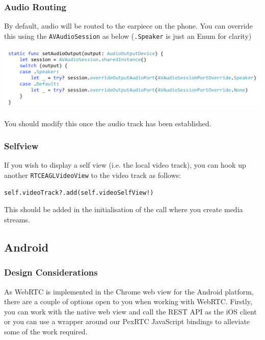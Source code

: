 \documentclass[a4paper,11pt]{article}
\begin{document}
\subsubsection{Audio Routing}
\label{sec:org1eb172f}
By default, audio will be routed to the earpiece on the phone.  You
can override this using the \texttt{AVAudioSession} as below (\texttt{.Speaker} is
just an Enum for clarity)

\begin{center}
\includegraphics[width=.9\linewidth]{./images/audio_routing_swift.png}
\end{center}

You should modify this once the audio track has been established.

\subsubsection{Selfview}
\label{sec:org2a87206}
If you wish to display a self view (i.e. the local video track), you
can hook up another \texttt{RTCEAGLVideoView} to the video track as follows:

\begin{verbatim}
self.videoTrack?.add(self.videoSelfView!)
\end{verbatim}

This should be added in the initialisation of the call where you
create media streams.

\subsection{Android}
\label{sec:org9dfbfce}

\subsubsection{Design Considerations}
\label{sec:orgb0704a5}

\label{orga2d90cc}

As WebRTC is implemented in the Chrome web view for the Android
platform, there are a couple of options open to you when working with
WebRTC.  Firstly, you can work with the native web view and call the
REST API as the iOS client or you can use a wrapper around our PexRTC
JavaScript bindings to alleviate some of the work required.
\end{document}
